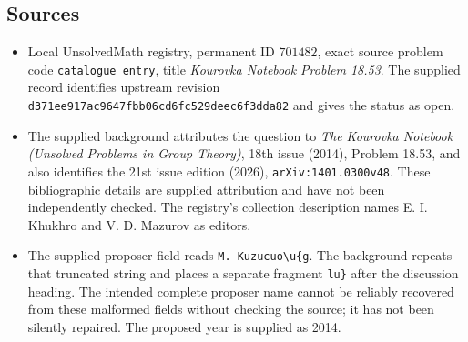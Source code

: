 \documentclass[11pt]{article}
\begin{document}
\subsection{Sources}
\begin{itemize}
\item Local UnsolvedMath registry, permanent ID \(701482\), exact source problem code \texttt{catalogue entry}, title \emph{Kourovka Notebook Problem 18.53}. The supplied record identifies upstream revision \texttt{d371ee917ac9647fbb06cd6fc529deec6f3dda82} and gives the status as open.
\item The supplied background attributes the question to \emph{The Kourovka Notebook (Unsolved Problems in Group Theory)}, 18th issue (2014), Problem 18.53, and also identifies the 21st issue edition (2026), \texttt{arXiv:1401.0300v48}. These bibliographic details are supplied attribution and have not been independently checked. The registry's collection description names E. I. Khukhro and V. D. Mazurov as editors.
\item The supplied proposer field reads \texttt{M. Kuzucuo\textbackslash u\{g}. The background repeats that truncated string and places a separate fragment \texttt{lu\}} after the discussion heading. The intended complete proposer name cannot be reliably recovered from these malformed fields without checking the source; it has not been silently repaired. The proposed year is supplied as 2014.
\end{itemize}
\end{document}
